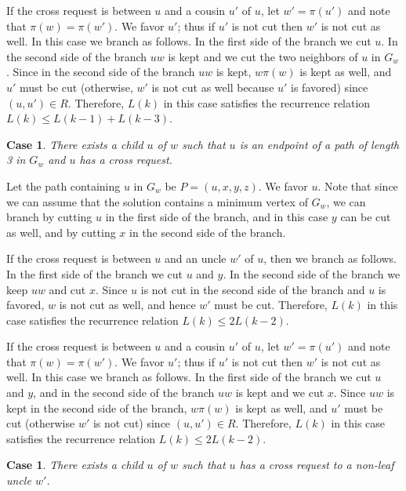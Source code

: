 \documentclass[11pt]{article}
\newtheorem{case}[theorem]{Case}
\begin{document}
If the cross request is between $u$ and a cousin $u'$ of $u$, let $w'=\pi(u')$ and note that $\pi(w) = \pi(w')$. We favor $u'$; thus if $u'$ is not cut then $w'$ is not cut as well. In this case we branch as follows. In the first side of the branch we cut $u$. In the second side of the branch $uw$ is kept and we cut the two neighbors of $u$ in $G_w$. Since in the second side of the branch $uw$ is kept, $w\pi(w)$ is kept as well, and $u'$ must be cut (otherwise, $w'$ is not cut as well because $u'$ is favored) since $(u, u') \in R$. Therefore, $L(k)$ in this case satisfies the recurrence relation $L(k) \leq L(k-1) + L(k-3)$.



\begin{case}\label{case:2.5}
There exists a child $u$ of $w$ such that $u$ is an endpoint of a path of length 3 in $G_w$ and $u$ has a cross request.
\end{case}

Let the path containing $u$ in $G_w$ be $P=(u, x, y, z)$. We favor $u$. Note that since we can assume that the solution contains a minimum vertex of $G_w$, we can branch by cutting $u$ in the first side of the branch, and in this case $y$ can be cut as well, and by cutting $x$ in the second side of the branch.

If the cross request is between $u$ and an uncle $w'$ of $u$, then we branch as follows. In the first side of the branch we cut $u$ and $y$. In the second side of the branch we keep $uw$ and cut $x$. Since $u$ is not cut in the second side of the branch and $u$ is favored, $w$ is not cut as well, and hence $w'$ must be cut. Therefore, $L(k)$ in this case satisfies the recurrence relation $L(k) \leq 2L(k-2)$.

If the cross request is between $u$ and a cousin $u'$ of $u$, let $w'=\pi(u')$ and note that $\pi(w) = \pi(w')$. We favor $u'$; thus if $u'$ is not cut then $w'$ is not cut as well. In this case we branch as follows. In the first side of the branch we cut $u$ and $y$, and in the second side of the branch $uw$ is kept and we cut $x$. Since $uw$ is kept in the second side of the branch, $w\pi(w)$ is kept as well, and $u'$ must be cut (otherwise $w'$ is not cut) since $(u, u') \in R$. Therefore, $L(k)$ in this case satisfies the recurrence relation $L(k) \leq 2L(k-2)$.


\begin{case}\label{case:1.5}
There exists a child $u$ of $w$ such that $u$ has a cross request to a non-leaf uncle $w'$.
\end{case}
\end{document}

